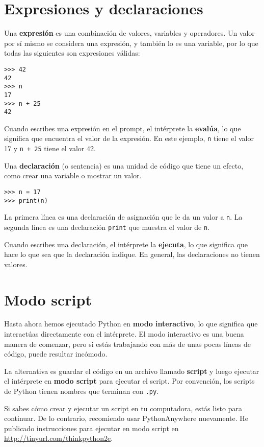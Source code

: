 \section{Expresiones y declaraciones}

Una \textbf{expresión} es una combinación de valores, variables y operadores. Un valor por sí mismo se considera una expresión, y también lo es una variable, por lo que todas las siguientes son expresiones válidas:

\begin{lstlisting}
>>> 42
42
>>> n
17
>>> n + 25
42
\end{lstlisting}

Cuando escribes una expresión en el prompt, el intérprete la \textbf{evalúa}, lo que significa que encuentra el valor de la expresión. En este ejemplo, \texttt{n} tiene el valor 17 y \texttt{n + 25} tiene el valor 42.

Una \textbf{declaración} (o sentencia) es una unidad de código que tiene un efecto, como crear una variable o mostrar un valor.

\begin{lstlisting}
>>> n = 17
>>> print(n)
\end{lstlisting}

La primera línea es una declaración de asignación que le da un valor a \texttt{n}. La segunda línea es una declaración \texttt{print} que muestra el valor de \texttt{n}.

Cuando escribes una declaración, el intérprete la \textbf{ejecuta}, lo que significa que hace lo que sea que la declaración indique. En general, las declaraciones no tienen valores.

\section{Modo script}

Hasta ahora hemos ejecutado Python en \textbf{modo interactivo}, lo que significa que interactúas directamente con el intérprete. El modo interactivo es una buena manera de comenzar, pero si estás trabajando con más de unas pocas líneas de código, puede resultar incómodo.

La alternativa es guardar el código en un archivo llamado \textbf{script} y luego ejecutar el intérprete en \textbf{modo script} para ejecutar el script. Por convención, los scripts de Python tienen nombres que terminan con \texttt{.py}.

Si sabes cómo crear y ejecutar un script en tu computadora, estás listo para continuar. De lo contrario, recomiendo usar PythonAnywhere nuevamente. He publicado instrucciones para ejecutar en modo script en \url{http://tinyurl.com/thinkpython2e}.

